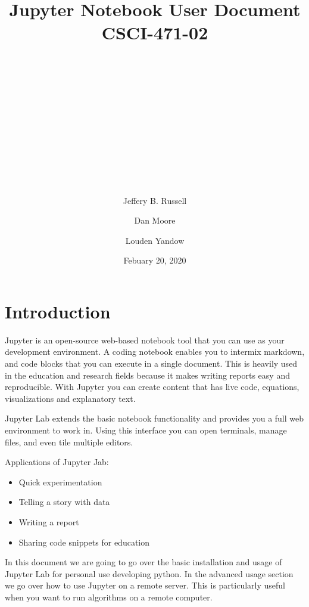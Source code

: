 \documentclass[pdftex,12pt]{artikel3}
\title{
\begin{center}
\huge{Jupyter Notebook User Document} \\
\huge{CSCI-471-02}\\
\end{center}
\\
\\
\\
\\
\\
\author{} %
\date{}   %
}
\begin{document}
\maketitle


\begin{center}
\author{Jeffery B. Russell}
\author{Dan Moore}
\author{Louden Yandow}

\date{Febuary 20, 2020}
\end{center}

\newpage

\tableofcontents
{}
\newpage
\listoffigures
{}

\newpage

\section{Introduction}

Jupyter  is an open-source web-based notebook tool that you can use as your development environment.
A coding notebook enables you to intermix markdown, and code blocks that you can execute in a single document. This is heavily used in the education and research fields because it makes writing reports easy and reproducible. With Jupyter you can create content that has live code, equations, visualizations and explanatory text.

Jupyter Lab extends the basic notebook functionality and provides you a full web environment to work in. Using this interface you can open terminals, manage files, and even tile multiple editors.

Applications of Jupyter Jab:

\begin{itemize}
  \item Quick experimentation
  \item Telling a story with data
  \item Writing a report
  \item Sharing code snippets for education
\end{itemize}

In this document we are going to go over the basic installation and usage of Jupyter Lab for personal use developing python. In the advanced usage section we go over how to use Jupyter on a remote server. This is particularly useful when you want to run algorithms on a remote computer.
\end{document}
